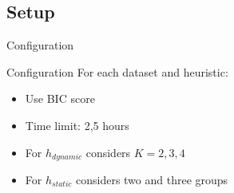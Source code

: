 \subsection{Setup}

\begin{frame}{Configuration}
	\begin{block}{Configuration}
		For each dataset and heuristic:
		\begin{itemize}
			\item Use BIC score
			\item Time limit: 2,5 hours
			\item For $h_{dynamic}$ considers $K = 2,3,4$
			\item For $h_{static}$ considers two and three groups
		\end{itemize}
	\end{block}
\end{frame}

\begin{frame}
	
\end{frame}